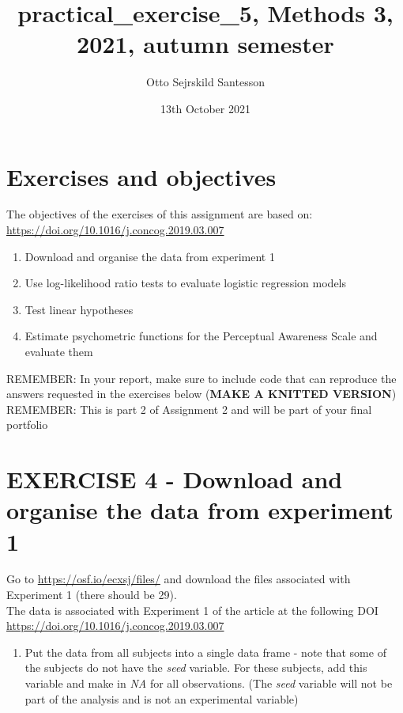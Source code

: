 \documentclass[
]{article}
\title{practical\_exercise\_5, Methods 3, 2021, autumn semester}
\author{Otto Sejrskild Santesson}
\date{13th October 2021}
\providecommand{\tightlist}{%
  \setlength{\itemsep}{0pt}\setlength{\parskip}{0pt}}
\begin{document}
\maketitle

\hypertarget{exercises-and-objectives}{%
\section{Exercises and objectives}\label{exercises-and-objectives}}

The objectives of the exercises of this assignment are based on:
\url{https://doi.org/10.1016/j.concog.2019.03.007}

\begin{enumerate}
\def\labelenumi{\arabic{enumi})}
\setcounter{enumi}{3}
\tightlist
\item
  Download and organise the data from experiment 1\\
\item
  Use log-likelihood ratio tests to evaluate logistic regression
  models\\
\item
  Test linear hypotheses\\
\item
  Estimate psychometric functions for the Perceptual Awareness Scale and
  evaluate them
\end{enumerate}

REMEMBER: In your report, make sure to include code that can reproduce
the answers requested in the exercises below (\textbf{MAKE A KNITTED
VERSION})\\
REMEMBER: This is part 2 of Assignment 2 and will be part of your final
portfolio

\hypertarget{exercise-4---download-and-organise-the-data-from-experiment-1}{%
\section{EXERCISE 4 - Download and organise the data from experiment
1}\label{exercise-4---download-and-organise-the-data-from-experiment-1}}

Go to \url{https://osf.io/ecxsj/files/} and download the files
associated with Experiment 1 (there should be 29).\\
The data is associated with Experiment 1 of the article at the following
DOI \url{https://doi.org/10.1016/j.concog.2019.03.007}

\begin{enumerate}
\def\labelenumi{\arabic{enumi})}
\tightlist
\item
  Put the data from all subjects into a single data frame - note that
  some of the subjects do not have the \emph{seed} variable. For these
  subjects, add this variable and make in \emph{NA} for all
  observations. (The \emph{seed} variable will not be part of the
  analysis and is not an experimental variable)
\end{enumerate}
\end{document}
